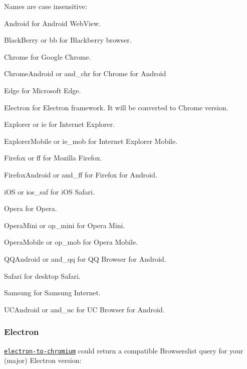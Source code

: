 Names are case insensitive\+:


\begin{DoxyItemize}
\item {\ttfamily Android} for Android Web\+View.
\item {\ttfamily Black\+Berry} or {\ttfamily bb} for Blackberry browser.
\item {\ttfamily Chrome} for Google Chrome.
\item {\ttfamily Chrome\+Android} or {\ttfamily and\+\_\+chr} for Chrome for Android
\item {\ttfamily Edge} for Microsoft Edge.
\item {\ttfamily Electron} for Electron framework. It will be converted to Chrome version.
\item {\ttfamily Explorer} or {\ttfamily ie} for Internet Explorer.
\item {\ttfamily Explorer\+Mobile} or {\ttfamily ie\+\_\+mob} for Internet Explorer Mobile.
\item {\ttfamily Firefox} or {\ttfamily ff} for Mozilla Firefox.
\item {\ttfamily Firefox\+Android} or {\ttfamily and\+\_\+ff} for Firefox for Android.
\item {\ttfamily i\+OS} or {\ttfamily ios\+\_\+saf} for i\+OS Safari.
\item {\ttfamily Opera} for Opera.
\item {\ttfamily Opera\+Mini} or {\ttfamily op\+\_\+mini} for Opera Mini.
\item {\ttfamily Opera\+Mobile} or {\ttfamily op\+\_\+mob} for Opera Mobile.
\item {\ttfamily Q\+Q\+Android} or {\ttfamily and\+\_\+qq} for QQ Browser for Android.
\item {\ttfamily Safari} for desktop Safari.
\item {\ttfamily Samsung} for Samsung Internet.
\item {\ttfamily U\+C\+Android} or {\ttfamily and\+\_\+uc} for UC Browser for Android.
\end{DoxyItemize}

\subsubsection*{Electron}

\href{https://www.npmjs.com/package/electron-to-chromium}{\tt {\ttfamily electron-\/to-\/chromium}} could return a compatible Browserslist query for your (major) Electron version\+:


